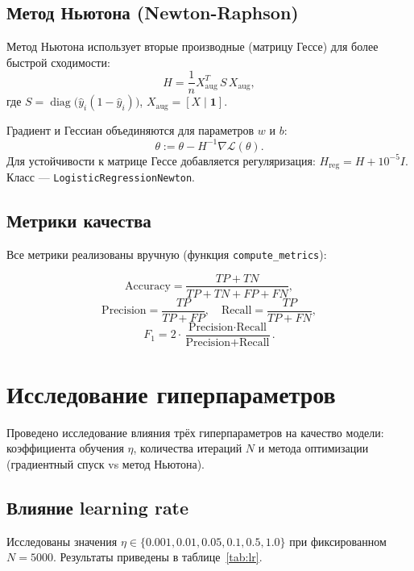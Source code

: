\documentclass[12pt,a4paper]{article}
\begin{document}
\subsection{Метод Ньютона (Newton-Raphson)}

Метод Ньютона использует вторые производные (матрицу Гессе) для более
быстрой сходимости:
\[
H = \frac{1}{n} X_{\text{aug}}^T \, S \, X_{\text{aug}},
\]
где \(S = \operatorname{diag}\bigl(\hat{y}_i (1 - \hat{y}_i)\bigr)\),
\(X_{\text{aug}} = [X \mid \mathbf{1}]\).

Градиент и Гессиан объединяются для параметров \(w\) и \(b\):
\[
\theta := \theta - H^{-1} \nabla \mathcal{L}(\theta).
\]
Для устойчивости к матрице Гессе добавляется регуляризация:
\(H_{\text{reg}} = H + 10^{-5} I\). Класс — \texttt{LogisticRegressionNewton}.

\subsection{Метрики качества}

Все метрики реализованы вручную (функция \texttt{compute\_metrics}):

\[
\text{Accuracy} = \frac{TP + TN}{TP + TN + FP + FN},
\]
\[
\text{Precision} = \frac{TP}{TP + FP},
\quad
\text{Recall} = \frac{TP}{TP + FN},
\]
\[
F_1 = 2 \cdot \frac{\text{Precision} \cdot \text{Recall}}{\text{Precision} + \text{Recall}}.
\]

\section{Исследование гиперпараметров}

Проведено исследование влияния трёх гиперпараметров на качество модели:
коэффициента обучения \(\eta\), количества итераций \(N\) и метода
оптимизации (градиентный спуск vs метод Ньютона).

\subsection{Влияние learning rate}

Исследованы значения \(\eta \in \{0.001, 0.01, 0.05, 0.1, 0.5, 1.0\}\)
при фиксированном \(N = 5000\). Результаты приведены в
таблице~\ref{tab:lr}.
\end{document}
